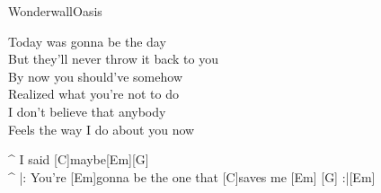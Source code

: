 \begin{song}{Wonderwall}{Oasis}
\begin{guitar}
Today was gonna be the day \\
But they'll never throw it back to you \\
By now you should've somehow \\
Realized what you're not to do \\
I don't believe that anybody \\
Feels the way I do about you now \\
\end{guitar}



\begin{guitar}
^ I said  [C]maybe[Em][G]\\
^ |: You're [Em]gonna be the one that [C]saves me [Em]   [G]  :|[Em]\\
\end{guitar}
\end{song}
